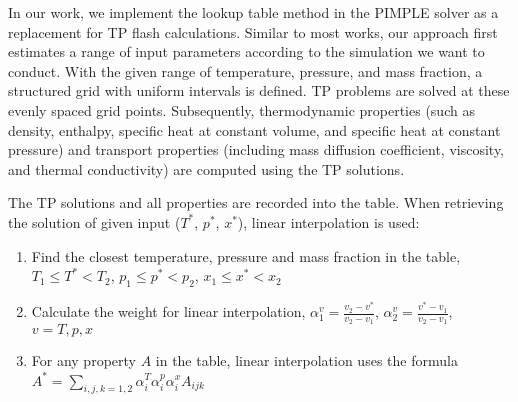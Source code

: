 In our work, we implement the lookup table method in the PIMPLE solver as a replacement for TP flash calculations. Similar to most works, our approach first estimates a range of input parameters according to the simulation we want to conduct. With the given range of temperature, pressure, and mass fraction, a structured grid with uniform intervals is defined. TP problems are solved at these evenly spaced grid points. Subsequently, thermodynamic properties (such as density, enthalpy, specific heat at constant volume, and specific heat at constant pressure) and transport properties (including mass diffusion coefficient, viscosity, and thermal conductivity) are computed using the TP solutions.


The TP solutions and all properties are recorded into the table. When retrieving the solution of given input ($T^*$, $p^*$, $x^*$), linear interpolation is used:
\begin{enumerate}
	\item Find the closest temperature, pressure and mass fraction in the table,
	      $T_1 \leq T^* < T_2 $,
	      $p_1 \leq p^* < p_2 $,
	      $x_1 \leq x^* < x_2 $
	\item Calculate the weight for linear interpolation,
	      $ \alpha^v_1=\frac{v_2-v^*}{v_2-v_1}$,
	      $ \alpha^v_2=\frac{v^*-v_1}{v_2-v_1}$, $v=T,p,x$
	\item For any property $A$ in the table, linear interpolation uses the formula $A^* = \sum_{i,j,k=1,2}\alpha^T_i \alpha^p_i \alpha^x_i A_{ijk} $
\end{enumerate}




